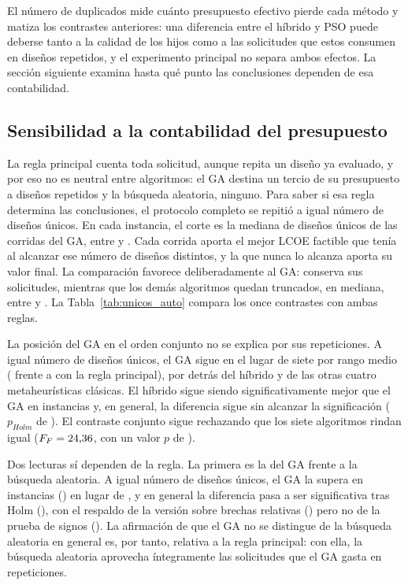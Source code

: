 El número de duplicados mide cuánto presupuesto efectivo pierde cada método y matiza los contrastes anteriores: una diferencia entre el híbrido y PSO puede deberse tanto a la calidad de los hijos como a las solicitudes que estos consumen en diseños repetidos, y el experimento principal no separa ambos efectos. La sección siguiente examina hasta qué punto las conclusiones dependen de esa contabilidad.

\subsection{Sensibilidad a la contabilidad del presupuesto}
\label{sec:sens_unicos}

La regla principal cuenta toda solicitud, aunque repita un diseño ya evaluado, y por eso no es neutral entre algoritmos: el GA destina un tercio de su presupuesto a diseños repetidos y la búsqueda aleatoria, ninguno. Para saber si esa regla determina las conclusiones, el protocolo completo se repitió a igual número de diseños únicos. En cada instancia, el corte es la mediana de diseños únicos de las corridas del GA, entre \UniqueCutMin{} y \UniqueCutMax{}. Cada corrida aporta el mejor LCOE factible que tenía al alcanzar ese número de diseños distintos, y la que nunca lo alcanza aporta su valor final. La comparación favorece deliberadamente al GA: conserva sus \RequestsPerRun{} solicitudes, mientras que los demás algoritmos quedan truncados, en mediana, entre \UniqueCutRequestsMin{} y \UniqueCutRequestsMax. La Tabla~\ref{tab:unicos_auto} compara los once contrastes con ambas reglas.

\TablaUnicosAuto

La posición del GA en el orden conjunto no se explica por sus repeticiones. A igual número de diseños únicos, el GA sigue en el lugar \UniqueGaRankPosition{} de siete por rango medio (\UniqueMeanRankGa{} frente a \MeanRankGa{} con la regla principal), por detrás del híbrido y de las otras cuatro metaheurísticas clásicas. El híbrido sigue siendo significativamente mejor que el GA en \UniqueCtrlGaPlus{} instancias y, en general, la diferencia sigue sin alcanzar la significación ($p_{Holm}$ de \UniqueCtrlGaWilcoxonHolm). El contraste conjunto sigue rechazando que los siete algoritmos rindan igual ($F_F=\text{24,36}$, con un valor $p$ de \UniqueImanDavenportP).

Dos lecturas sí dependen de la regla. La primera es la del GA frente a la búsqueda aleatoria. A igual número de diseños únicos, el GA la supera en \UniqueBaseGaPlus{} instancias (\UniqueBaseGaPlusInstances) en lugar de \BaseGaPlus, y en general la diferencia pasa a ser significativa tras Holm (\UniqueBaseGaWilcoxonHolm), con el respaldo de la versión sobre brechas relativas (\UniqueBaseGaRelativeP) pero no de la prueba de signos (\UniqueBaseGaSignP). La afirmación de que el GA no se distingue de la búsqueda aleatoria en general es, por tanto, relativa a la regla principal: con ella, la búsqueda aleatoria aprovecha íntegramente las solicitudes que el GA gasta en repeticiones.

